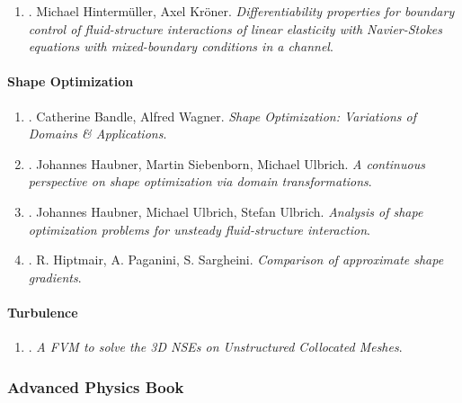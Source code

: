 \documentclass{article}
\begin{document}
\begin{enumerate}
	\item \cite{Hintermueller_Kroener2023}. Michael Hinterm\"uller, Axel Kr\"oner. {\it Differentiability properties for boundary control of fluid-structure interactions of linear elasticity with Navier-Stokes equations with mixed-boundary conditions in a channel}.\hfill{\sf[done]}
\end{enumerate}

\paragraph{Shape Optimization}

\begin{enumerate}
	\item \cite{Bandle_Wagner2023}. Catherine Bandle, Alfred Wagner. {\it Shape Optimization: Variations of Domains \& Applications}.\hfill{\sf[reading]}
	\item \cite{Haubner_Siebenborn_Ulbrich2021}. Johannes Haubner, Martin Siebenborn, Michael Ulbrich. {\it A continuous perspective on shape optimization via domain transformations}.\hfill{\sf[done]}
	\item \cite{Haubner_Ulbrich_Ulbrich2020}. Johannes Haubner, Michael Ulbrich, Stefan Ulbrich. {\it Analysis of shape optimization problems for unsteady fluid-structure interaction}.\hfill{\sf[done]}
	\item \cite{Hiptmair_Paganini_Sargheini2015}. R. Hiptmair, A. Paganini, S. Sargheini. {\it Comparison of approximate shape gradients}.\hfill{\sf[done]}
\end{enumerate}

\paragraph{Turbulence}

\begin{enumerate}
	\item \cite{Perron_Boivin_Herard2004}. {\it A FVM to solve the 3{D} NSEs on Unstructured Collocated Meshes}.\hfill{\sf[reading]}
\end{enumerate}


\subsubsection{Advanced Physics Book}
\end{document}
